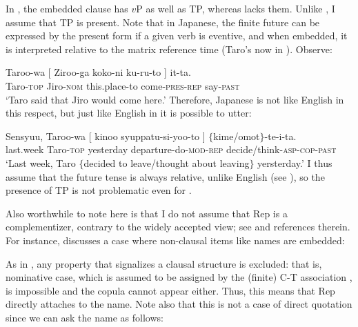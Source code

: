\documentclass[output=paper]{langsci/langscibook}
\begin{document}
In , the embedded clause has $v$P as well as TP, whereas  lacks them. Unlike , I assume that TP is present. Note that in Japanese, the finite future can be expressed by the present form if a given verb is eventive, and when embedded, it is interpreted relative to the matrix reference time (Taro's now in ). Observe:

\ea\label{shimamu23}
\gll Taroo-wa [ Ziroo-ga koko-ni ku-ru-to ] it-ta.\\
Taro-\textsc{top} {} Jiro-\textsc{nom} this.place-to come-\textsc{pres-rep} {} say-\textsc{past}\\
\glt `Taro said that Jiro would come here.' 
\z
Therefore, Japanese is not like English in this respect, but just like English in  it is possible to utter:

\ea\label{shimamu24} \gll Sensyuu, Taroo-wa [ kinoo syuppatu-si-yoo-to ] $\{$kime/omot$\}$-te-i-ta.\\
last.week Taro-\textsc{top} {} yesterday departure-do-\textsc{mod-rep} {} \phantom{$\{$}decide/think-\textsc{asp-cop-past}\\
\glt `Last week, Taro $\{$decided to leave/thought about leaving$\}$ yersterday.'
\z
I thus assume that the future tense is always relative, unlike English (see \citealt{ogihara1995}), so the presence of TP is not problematic even for .

Also worthwhile to note here is that I do not assume that Rep is a complementizer, contrary to the widely accepted view; see \citet{shimamura2018} and references therein. For instance, \citeauthor{shimamura2018} discusses a case where non-clausal items like names are embedded:

\ea\label{shimamu24.5} \begin{xlist}
\end{xlist}
\z
As in , any property that signalizes a clausal structure is excluded: that is, nominative case, which is assumed to be assigned by the (finite) C-T association \citep{chomsky2008}, is impossible and the copula cannot appear either. Thus, this means that Rep directly attaches to the name. Note also that this is not a case of direct quotation since we can ask the name as follows:
\end{document}
